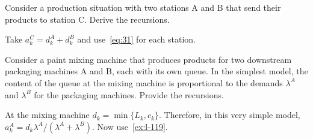\begin{exercise}\label{ex:l-120}
 Consider  a production situation with two stations A and B that send their products to station C.
Derive the  recursions.
\begin{solution}
Take  $a_k^C = d_{k}^A+d_{k}^B$ and use~\cref{eq:31} for each station.
\end{solution}
\end{exercise}



\begin{exercise}
 Consider a paint mixing machine that produces products for two downstream packaging machines A and B, each with its own queue.
In the simplest model, the content of the queue at the mixing machine is proportional to the demands $\lambda^A$ and $\lambda^B$ for the packaging machines. 
 Provide the recursions.
\begin{solution}
At  the mixing machine $d_k=\min\{L_k, c_k\}$. Therefore, in this very simple model, $a_k^A = d_k \lambda^A/(\lambda^A+\lambda^B)$.  Now use~\cref{ex:l-119}.
\end{solution}
\end{exercise}







